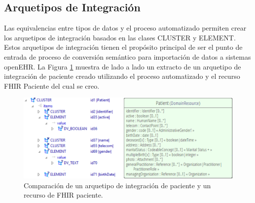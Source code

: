 \subsection{Arquetipos de Integración}

Las equivalencias entre tipos de datos y el proceso automatizado permiten crear los arquetipos de integración basados en las clases CLUSTER y ELEMENT. Estos arquetipos de integración tienen el propósito principal de ser el punto de entrada de proceso de conversión semántico para importación de datos a sistemas openEHR. La Figura \ref{fig:comparison} muestra de lado a lado un extracto de un arquetipo de integración de paciente creado utilizando el proceso automatizado y el recurso FHIR Paciente del cual se creo.

\begin{figure}
  \centering
  \includegraphics[scale=0.8]{./images/comparison_patient}
  \caption{Comparación de un arquetipo de integración de paciente y un recurso de FHIR paciente.}
  \label{fig:comparison}
\end{figure}
